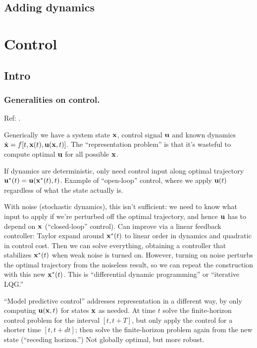 \documentclass[notitlepage,openany,11pt]{report}
\theoremstyle{plain}%
\numberwithin{equation}{section}
\begin{document}
\section{Adding dynamics}




\chapter{Control}

\section{Intro}

\subsection{Generalities on control.}
Ref: \cite{KappenRuiz:16}.

Generically we have a system state $\mathbf{x}$, control signal $\mathbf{u}$ and known dynamics $\dot{\mathbf{x}} = f[t, \mathbf{x}(t), \mathbf{u}(\mathbf{x},t)]$. The ``representation problem'' is that it's wasteful to compute optimal $\mathbf{u}$ for all possible $\mathbf{x}$.

If dynamics are deterministic, only need control input along optimal trajectory $\mathbf{u}^{\ast}(t) = \mathbf{u}(\mathbf{x}^{\ast}(t), t)$. Example of ``open-loop'' control, where we apply $\mathbf{u}(t)$ regardless of what the state actually is. 

With noise (stochastic dynamics), this isn't sufficient: we need to know what input to apply if we're perturbed off the optimal trajectory, and hence $\mathbf{u}$ has to depend on $\mathbf{x}$ (``closed-loop'' control). Can improve via a linear feedback controller: Taylor expand around $\mathbf{x}^{\ast}(t)$ to linear order in dynamics and quadratic in control cost. Then we can solve everything, obtaining a controller that stabilizes $\mathbf{x}^{\ast}(t)$ when weak noise is turned on. However, turning on noise perturbs the optimal trajectory from the noiseless result, so we can repeat the construction with this new $\mathbf{x}^{\ast}(t)$. This is ``differential dynamic programming'' or ``iterative LQG.''

``Model predictive control'' addresses representation in a different way, by only computing $\mathbf{u}(\mathbf{x},t)$ for states $\mathbf{x}$ as needed. At time $t$ solve the finite-horizon control problem for the interval  $[t, t+T]$, but only apply the control for a shorter time $[t, t+dt]$; then solve the finite-horizon problem again from the new state (``receding horizon.'') Not globally optimal, but more robust.
\end{document}
